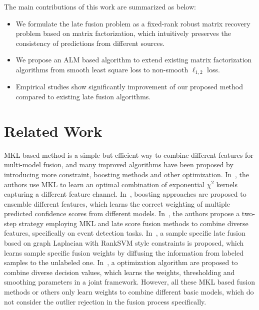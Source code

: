\documentclass[10pt,twocolumn,letterpaper]{article}
\begin{document}
The main contributions of this work are summarized as below:
\begin{itemize}
  \item We formulate the late fusion problem as a fixed-rank robust matrix recovery problem based on matrix factorization, which intuitively preserves the consistency of predictions from different sources.
  \item We propose an ALM based algorithm to extend existing matrix factorization algorithms from smooth least square loss to non-smooth $\ell_{1,2}$ loss. 
  \item Empirical studies show significantly improvement of our proposed method compared to existing late fusion algorithms.
\end{itemize}

\section{Related Work}

MKL based method is a simple but efficient way to combine different features for multi-model fusion,
and many improved algorithms have been proposed by introducing more constraint, boosting methods and other optimization.
In~\cite{vedaldi2009multiple}, the authors use MKL to learn an optimal combination of exponential ${\chi}^2$ kernels capturing a different feature channel.
In~\cite{gehler2009feature}, boosting approaches are proposed to ensemble different features, which learns the correct weighting of multiple predicted confidence scores from different models.
In~\cite{natarajan2012multimodal}, the authors propose a two-step strategy employing MKL and late score fusion methods to combine diverse features, specifically on event detection tasks.
In~\cite{lai2015learning}, a sample specific late fusion based on graph Laplacian with RankSVM style constraints is proposed,
which learns sample specific fusion weights by diffusing the information from labeled samples to the unlabeled one.
In~\cite{xuiccv2013feature}, a optimization algorithm are proposed to combine diverse decision values,
which learns the weights, thresholding and smoothing parameters in a joint framework.
However, all these MKL based fusion methods or others only learn weights to combine different basic models, which do not consider the outlier rejection in the fusion process specifically.
\end{document}
